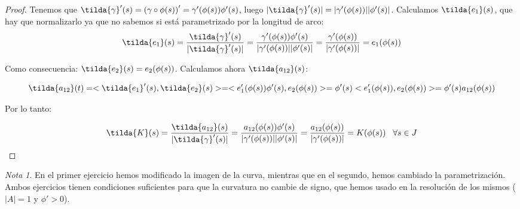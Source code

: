 \documentclass[12pt]{article}
\theoremstyle{definition}
\theoremstyle{remark}
\newtheorem{remark}[theorem]{Nota}
\begin{document}
\begin{proof}

Tenemos que $\tilda{\gamma}'(s)=\left(\gamma\circ\phi(s)\right)'=\gamma'(\phi(s))\phi'(s)$, luego $|\tilda{\gamma}'(s)|=|\gamma'(\phi(s))||\phi'(s)|$. Calculamos $\tilda{e_1}(s)$, que hay que normalizarlo ya que no sabemos si está parametrizado por la longitud de arco: 
\[
\tilda{e_1}(s)=\frac{\tilda{\gamma}'(s)}{|\tilda{\gamma}'(s)|}=\frac{\gamma'(\phi(s))\phi'(s)}{|\gamma'(\phi(s))||\phi'(s)|}=\frac{\gamma'(\phi(s))}{|\gamma'(\phi(s))|}=e_1(\phi(s))
\]

Como consecuencia: $\tilda{e_2}(s)=e_2(\phi(s))$. Calculamos ahora $\tilda{a_{12}}(s)$:

\[
\tilda{a_{12}}(t)=<\tilda{e_1}'(s),\tilda{e_2}(s)>=<e_1'(\phi(s))\phi'(s),e_2(\phi(s))>=\phi'(s)<e_1'(\phi(s)),e_2(\phi(s))>=\phi'(s)a_{12}(\phi(s))
\]

Por lo tanto:

\[
\tilda{K}(s)=\frac{\tilda{a_{12}}(s)}{|\tilda{\gamma}'(s)|}=\frac{a_{12}(\phi(s))\phi'(s)}{|\gamma'(\phi(s))||\phi'(s)|}=\frac{a_{12}(\phi(s))}{|\gamma'(\phi(s))|}=K(\phi(s)) \espacio \forall s\in J
\]

\end{proof}

\begin{remark}
En el primer ejercicio hemos modificado la imagen de la curva, mientras que en el segundo, hemos cambiado la parametrización. Ambos ejercicios tienen condiciones suficientes para que la curvatura no cambie de signo, que hemos usado en la resolución de los mismos ($|A|=1$ y $\phi'>0$).
\end{remark}
\end{document}
